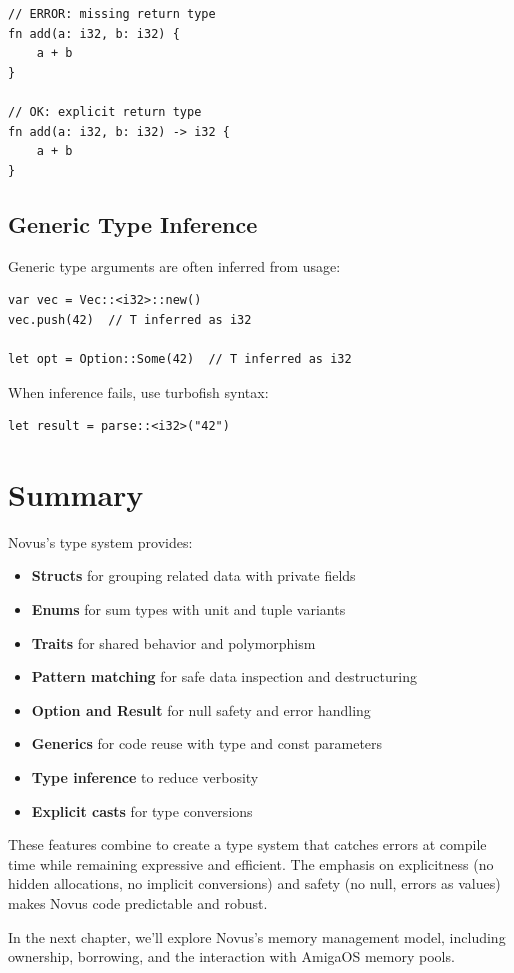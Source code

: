 \begin{lstlisting}
// ERROR: missing return type
fn add(a: i32, b: i32) {
    a + b
}

// OK: explicit return type
fn add(a: i32, b: i32) -> i32 {
    a + b
}
\end{lstlisting}

\subsection{Generic Type Inference}

Generic type arguments are often inferred from usage:

\begin{lstlisting}
var vec = Vec::<i32>::new()
vec.push(42)  // T inferred as i32

let opt = Option::Some(42)  // T inferred as i32
\end{lstlisting}

When inference fails, use turbofish syntax:

\begin{lstlisting}
let result = parse::<i32>("42")
\end{lstlisting}

\section{Summary}

Novus's type system provides:

\begin{itemize}
\item \textbf{Structs} for grouping related data with private fields
\item \textbf{Enums} for sum types with unit and tuple variants
\item \textbf{Traits} for shared behavior and polymorphism
\item \textbf{Pattern matching} for safe data inspection and destructuring
\item \textbf{Option and Result} for null safety and error handling
\item \textbf{Generics} for code reuse with type and const parameters
\item \textbf{Type inference} to reduce verbosity
\item \textbf{Explicit casts} for type conversions
\end{itemize}

These features combine to create a type system that catches errors at compile time while remaining expressive and efficient. The emphasis on explicitness (no hidden allocations, no implicit conversions) and safety (no null, errors as values) makes Novus code predictable and robust.

In the next chapter, we'll explore Novus's memory management model, including ownership, borrowing, and the interaction with AmigaOS memory pools.
